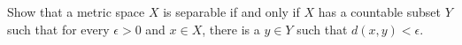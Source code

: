 Show that a metric space $X$ is separable if and only if $X$ has a countable subset $Y$ such that for
every $\epsilon>0$ and $x\in X$, there is a $y\in Y$ such that $d(x,y)<\epsilon$.\\
